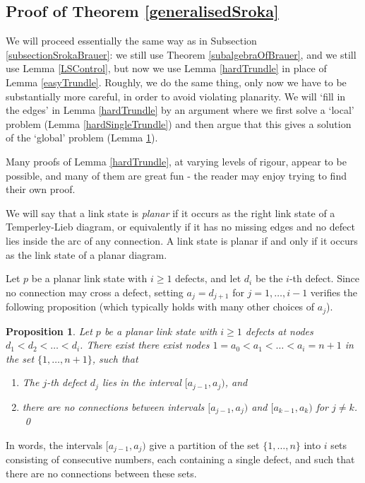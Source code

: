 \documentclass[12pt]{amsart}
\theoremstyle{plain}
\theoremstyle{definition} \newtheorem{definition}[theorem]{Definition}
\theoremstyle{plain}
\theoremstyle{plain} \newtheorem{proposition}[theorem]{Proposition}
\theoremstyle{plain} \newtheorem{conjecture}[theorem]{Conjecture}
\theoremstyle{plain} \newtheorem{corollary}[theorem]{Corollary}
\theoremstyle{remark} \newtheorem{claim}[theorem]{Claim}
\theoremstyle{remark} \newtheorem{remark}[theorem]{Remark}
\theoremstyle{remark} \newtheorem{example}[theorem]{Example}
\theoremstyle{remark} \newtheorem{comment}[theorem]{Comment}
\theoremstyle{definition} \newtheorem{question}[theorem]{Question}
\begin{document}
\subsection{Proof of Theorem \ref{generalisedSroka}} \label{subsectionSrokaTL}

We will proceed essentially the same way as in Subsection \ref{subsectionSrokaBrauer}: we still use Theorem \ref{subalgebraOfBrauer}, and we still use Lemma \ref{LSControl}, but now we use Lemma \ref{hardTrundle} in place of Lemma \ref{easyTrundle}. Roughly, we do the same thing, only now we have to be substantially more careful, in order to avoid violating planarity. We will `fill in the edges' in Lemma \ref{hardTrundle} by an argument where we first solve a `local' problem (Lemma \ref{hardSingleTrundle}) and then argue that this gives a solution of the `global' problem (Lemma \ref{spheresOfInfluence}).

Many proofs of Lemma \ref{hardTrundle}, at varying levels of rigour, appear to be possible, and many of them are great fun - the reader may enjoy trying to find their own proof.

We will say that a link state is \emph{planar} if it occurs as the right link state of a Temperley-Lieb diagram, or equivalently if it has no missing edges and no defect lies inside the arc of any connection. A link state is planar if and only if it occurs as the link state of a planar diagram.

Let $p$ be a planar link state with $i \geq 1$ defects, and let $d_i$ be the $i$-th defect. Since no connection may cross a defect, setting $a_j = d_{j+1}$ for $j=1, \dots , i-1$ verifies the following proposition (which typically holds with many other choices of $a_j$).

\begin{proposition} \label{spheresOfInfluence} Let $p$ be a planar link state with $i \geq 1$ defects at nodes $d_1 < d_2 < \dots < d_i$. There exist there exist nodes $1=a_0 < a_1 < \dots < a_i = n+1$ in the set $\{1, \dots, n+1 \}$, such that
\begin{enumerate}
    \item The $j$-th defect $d_j$ lies in the interval $[a_{j-1},a_j)$, and
    \item there are no connections between intervals $[a_{j-1},a_j)$ and $[a_{k-1},a_k)$ for $j \neq k$. \qed
\end{enumerate} \end{proposition}

In words, the intervals $[a_{j-1},a_j)$ give a partition of the set $\{1, \dots, n \}$ into $i$ sets consisting of consecutive numbers, each containing a single defect, and such that there are no connections between these sets.
\end{document}
